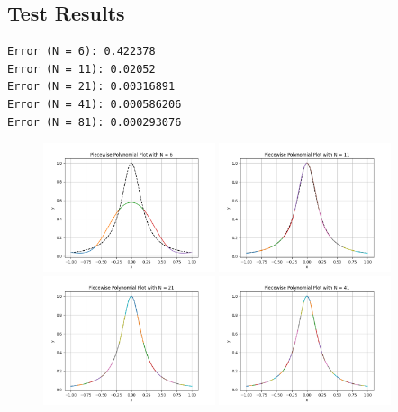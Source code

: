 \documentclass[a4paper]{article}
\begin{document}
\subsection{Test Results}

\begin{verbatim}
Error (N = 6): 0.422378
Error (N = 11): 0.02052
Error (N = 21): 0.00316891
Error (N = 41): 0.000586206
Error (N = 81): 0.000293076
\end{verbatim}

\begin{figure}[H]
    \centering
    \includegraphics[width=0.45\textwidth]{./figure/problemA/N_6.png}
    \includegraphics[width=0.45\textwidth]{./figure/problemA/N_11.png}
    \includegraphics[width=0.45\textwidth]{./figure/problemA/N_21.png}
    \includegraphics[width=0.45\textwidth]{./figure/problemA/N_41.png}

\end{figure}
\end{document}
